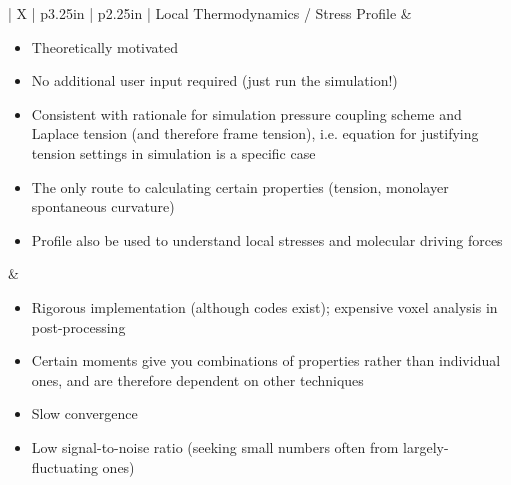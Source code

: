 \documentclass[9pt,bestpractices]{livecoms}
\begin{document}
\begin{table}[t]
\begin{tabularx}{\linewidth}{| X | p{3.25in} | p{2.25in} |}
Local Thermodynamics / Stress Profile & \begin{minipage}[t]{\linewidth} \begin{itemize}[nosep,after=\strut] \item Theoretically motivated \item No additional user input required (just run the simulation!) \item Consistent with rationale for simulation pressure coupling scheme and Laplace tension (and therefore frame tension), i.e. equation for justifying tension settings in simulation is a specific case \item The only route to calculating certain properties (tension, monolayer spontaneous curvature) \item Profile also be used to understand local stresses and molecular driving forces \end{itemize} \end{minipage} & \begin{minipage}[t]{\linewidth} \begin{itemize}[nosep,after=\strut] \item Rigorous implementation (although codes exist); expensive voxel analysis in post-processing \item Certain moments give you combinations of properties rather than individual ones, and are therefore dependent on other techniques \item Slow convergence \item Low signal-to-noise ratio (seeking small numbers often from largely-fluctuating ones) \end{itemize} \end{minipage} \\   
\hline

\end{tabularx}
\end{table}
\end{document}
